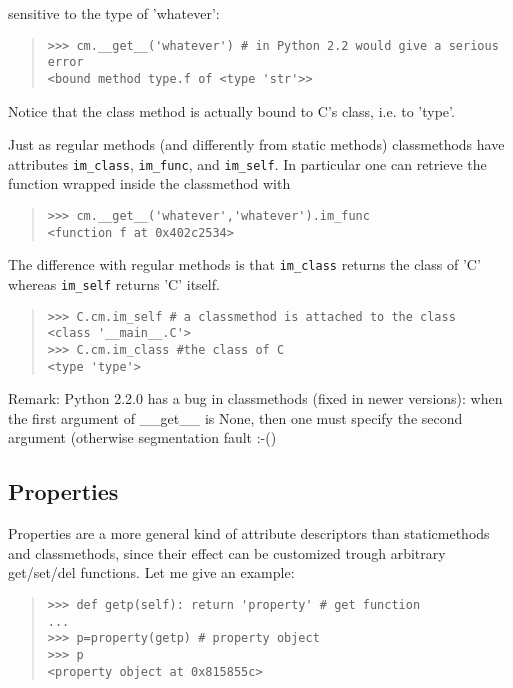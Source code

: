 \documentclass[10pt,english]{article}
\begin{document}
sensitive to the type of 'whatever':
\begin{quote}
\begin{verbatim}>>> cm.__get__('whatever') # in Python 2.2 would give a serious error
<bound method type.f of <type 'str'>>\end{verbatim}
\end{quote}

Notice that the class method is actually bound to C's class, i.e.
to 'type'.

Just as regular methods (and differently
from static methods) classmethods have attributes \texttt{im{\_}class}, \texttt{im{\_}func}, 
and \texttt{im{\_}self}. In particular one can retrieve the function wrapped inside
the classmethod with
\begin{quote}
\begin{verbatim}>>> cm.__get__('whatever','whatever').im_func 
<function f at 0x402c2534>\end{verbatim}
\end{quote}

The difference with regular methods is that \texttt{im{\_}class} returns the
class of 'C' whereas \texttt{im{\_}self} returns 'C' itself.
\begin{quote}
\begin{verbatim}>>> C.cm.im_self # a classmethod is attached to the class
<class '__main__.C'>
>>> C.cm.im_class #the class of C
<type 'type'>\end{verbatim}
\end{quote}

Remark: Python 2.2.0 has a bug in classmethods (fixed in newer versions):
when the first argument of {\_}{\_}get{\_}{\_} is None, then one must specify 
the second argument (otherwise segmentation fault :-()



\hypertarget{properties}{}
\subsection*{Properties}

Properties are a more general kind of attribute descriptors than 
staticmethods and classmethods, since their effect can be customized
trough arbitrary get/set/del functions. Let me give an example:
\begin{quote}
\begin{verbatim}>>> def getp(self): return 'property' # get function
...
>>> p=property(getp) # property object
>>> p
<property object at 0x815855c>\end{verbatim}
\end{quote}
\end{document}

